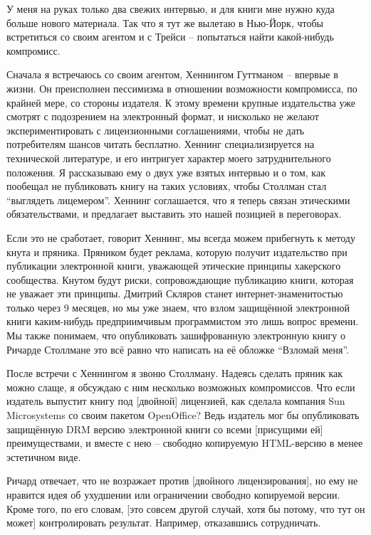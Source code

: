 У меня на руках только два свежих интервью, и для книги мне нужно куда больше нового материала. Так что я тут же вылетаю в Нью-Йорк, чтобы встретиться со своим агентом и с Трейси -- попытаться найти какой-нибудь компромисс.

Сначала я встречаюсь со своим агентом, Хеннингом Гуттманом -- впервые в жизни. Он преисполнен пессимизма в отношении возможности компромисса, по крайней мере, со стороны издателя. К этому времени крупные издательства уже смотрят с подозрением на электронный формат, и нисколько не желают экспериментировать с лицензионными соглашениями, чтобы не дать потребителям шансов читать бесплатно. Хеннинг специализируется на технической литературе, и его интригует характер моего затруднительного положения. Я рассказываю ему о двух уже взятых интервью и о том, как пообещал не публиковать книгу на таких условиях, чтобы Столлман стал ``выглядеть лицемером''. Хеннинг соглашается, что я теперь связан этическими обязательствами, и предлагает выставить это нашей позицией в переговорах.

Если это не сработает, говорит Хеннинг, мы всегда можем прибегнуть к методу кнута и пряника. Пряником будет реклама, которую получит издательство при публикации электронной книги, уважающей этические принципы хакерского сообщества. Кнутом будут риски, сопровождающие публикацию книги, которая не уважает эти принципы. Дмитрий Скляров станет интернет-знаменитостью только через 9 месяцев, но мы уже знаем, что взлом защищённой электронной книги каким-нибудь предприимчивым программистом это лишь вопрос времени. Мы также понимаем, что опубликовать зашифрованную электронную книгу о Ричарде Столлмане это всё равно что написать на её обложке ``Взломай меня''.

После встречи с Хеннингом я звоню Столлману. Надеясь сделать пряник как можно слаще, я обсуждаю с ним несколько возможных компромиссов. Что если издатель выпустит книгу под [двойной] лицензией, как сделала компания Sun Microsystems со своим пакетом OpenOffice? Ведь издатель мог бы опубликовать защищённую DRM  версию электронной книги со всеми [присущими ей] преимуществами, и вместе с нею -- свободно копируемую HTML-версию в менее эстетичном виде.

Ричард отвечает, что не возражает против [двойного лицензирования], но ему не нравится идея об ухудшении или ограничении свободно копируемой версии. Кроме того, по его словам, [это совсем другой случай, хотя бы потому, что тут он может] контролировать результат. Например, отказавшись сотрудничать.

